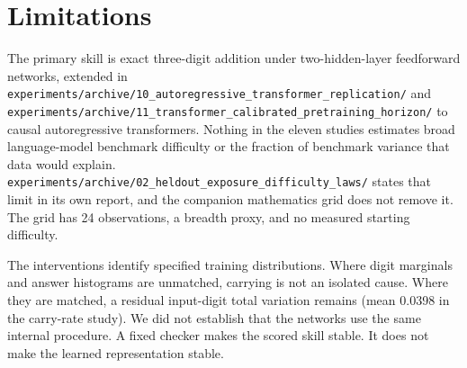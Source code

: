 \section{Limitations}
\label{sec:limitations}

The primary skill is exact three-digit addition under two-hidden-layer feedforward networks, extended in \texttt{experiments/archive/10\_autoregressive\_transformer\_replication/} and \texttt{experiments/archive/11\_transformer\_calibrated\_pretraining\_horizon/} to causal autoregressive transformers.
Nothing in the eleven studies estimates broad language-model benchmark difficulty or the fraction of benchmark variance that data would explain.
\texttt{experiments/archive/02\_heldout\_exposure\_difficulty\_laws/} states that limit in its own report, and the companion mathematics grid does not remove it.
The grid has 24 observations, a breadth proxy, and no measured starting difficulty.

The interventions identify specified training distributions.
Where digit marginals and answer histograms are unmatched, carrying is not an isolated cause.
Where they are matched, a residual input-digit total variation remains (mean 0.0398 in the carry-rate study).
We did not establish that the networks use the same internal procedure.
A fixed checker makes the scored skill stable.
It does not make the learned representation stable.

